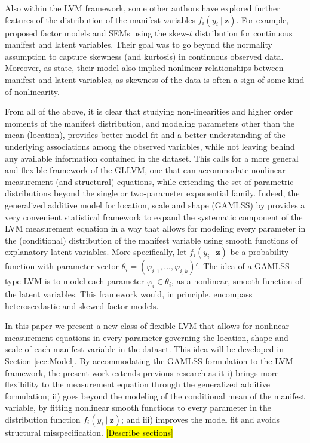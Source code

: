 \documentclass[11pt, a4paper]{article}
\newcommand{\cond}{\!~|~\!}
\begin{document}
Also within the LVM framework, some other authors have explored further features of the distribution of the manifest variables $f_i(y_i\cond\mathbf{z})$. For example, \citet{LinEtAl_TEST2015, Asparouhov&Muthen_SEM2016, WangEtAl_StatMethAppl2017} proposed factor models and SEMs using the skew-$t$ distribution for continuous manifest and latent variables. Their goal was to go beyond the normality assumption to capture skewness (and kurtosis) in continuous observed data. Moreover, as \citet{Asparouhov&Muthen_SEM2016} state, their model also implied nonlinear relationships between manifest and latent variables, as skewness of the data is often a sign of some kind of nonlinearity.

From all of the above, it is clear that studying non-linearities and higher order moments of the manifest distribution, and modeling parameters other than the mean (location), provides better model fit and a better understanding of the underlying associations among the observed variables, while not leaving behind any available information contained in the dataset. This calls for a more general and flexible framework of the GLLVM, one that can accommodate nonlinear measurement (and structural) equations, while extending the set of parametric distributions beyond the single or two-parameter exponential family. Indeed, the generalized additive model for location, scale and shape (GAMLSS) by \citet{Rigby&Stasinopoulos_JofRSS2005} provides a very convenient statistical framework to expand the systematic component of the LVM measurement equation in a way that allows for modeling every parameter in the (conditional) distribution of the manifest variable using smooth functions of explanatory latent variables. More specifically, let $f_i(y_i\cond\mathbf{z})$ be a probability function with parameter vector $\theta_i = (\varphi_{i,1},...,\varphi_{i,k})'$. The idea of a GAMLSS-type LVM is to model each parameter $\varphi_{i}  \in \theta_i$, as a nonlinear, smooth function of the latent variables. This framework would, in principle, encompass heteroscedastic and skewed factor models.

In this paper we present a new class of flexible LVM that allows for nonlinear measurement equations in every parameter governing the location, shape and scale of each manifest variable in the dataset. This idea will be developed in Section \ref{sec:Model}. By accommodating the GAMLSS formulation to the LVM framework, the present work extends previous research as it i) brings more flexibility to the measurement equation through the generalized additive formulation; ii) goes beyond the modeling of the conditional mean of the manifest variable, by fitting nonlinear smooth functions to every parameter in the distribution function $f_i(y_i\cond\mathbf{z})$; and iii) improves the model fit and avoids structural misspecification. \hl{[Describe sections]}
\end{document}
